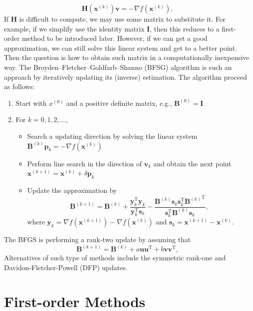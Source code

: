 \documentclass[
]{book}
\providecommand{\tightlist}{%
  \setlength{\itemsep}{0pt}\setlength{\parskip}{0pt}}
\theoremstyle{definition}
\theoremstyle{definition}
\theoremstyle{definition}
\theoremstyle{definition}
\theoremstyle{remark}
\begin{document}
\[\mathbf{H}(\mathbf{x}^{(k)}) \mathbf{v}= - \nabla f(\mathbf{x}^{(k)}), \]
If \(\mathbf{H}\) is difficult to compute, we may use some matrix to substitute it. For example, if we simplify use the identity matrix \(\mathbf{I}\), then this reduces to a first-order method to be introduced later. However, if we can get a good approximation, we can still solve this linear system and get to a better point. Then the question is how to obtain such matrix in a computationally inexpensive way. The Broyden--Fletcher--Goldfarb--Shanno (BFSG) algorithm is such an approach by iteratively updating its (inverse) estimation. The algorithm proceed as follows:

\begin{enumerate}
\def\labelenumi{\arabic{enumi})}
\tightlist
\item
  Start with \(x^{(0)}\) and a positive definite matrix, e.g., \(\mathbf{B}^{(0)} = \mathbf{I}\)
\item
  For \(k = 0, 1, 2, \ldots\),

  \begin{itemize}
  \tightlist
  \item
    Search a updating direction by solving the linear system \(\mathbf{B}^{(k)} \mathbf{p}_k = - \nabla f(\mathbf{x}^{(k)})\)
  \item
    Perform line search in the direction of \(\mathbf{v}_k\) and obtain the next point \(\mathbf{x}^{(k+1)} = \mathbf{x}^{(k)} + \delta \mathbf{p}_k\)
  \item
    Update the approximation by
    \[ \mathbf{B}^{(k+1)} = \mathbf{B}^{(k)} + \frac{\mathbf{y}_k^\text{T}\mathbf{y}_{k}}{ \mathbf{y}_{k}^\text{T}\mathbf{s}_{k} } -  \frac{\mathbf{B}^{(k)}\mathbf{s}_{k}\mathbf{s}_{k}^\text{T}{\mathbf{B}^{(k)}}^\text{T}}{\mathbf{s}_{k}^\text{T}\mathbf{B}^{(k)} \mathbf{s}_{k} }, \]
    where \(\mathbf{y}_k = \nabla f(\mathbf{x}^{(k+1)}) - \nabla f(\mathbf{x}^{(k)})\) and \(\mathbf{s}_{k} = \mathbf{x}^{(k+1)} - \mathbf{x}^{(k)}\).
  \end{itemize}
\end{enumerate}

The BFGS is performing a rank-two update by assuming that
\[ \mathbf{B}^{(k+1)} = \mathbf{B}^{(k)} + a \mathbf{u}\mathbf{u}^\text{T}+ b \mathbf{v}\mathbf{v}^\text{T},\]
Alternatives of such type of methods include the symmetric rank-one and Davidon-Fletcher-Powell (DFP) updates.

\hypertarget{first-order-methods}{%
\section{First-order Methods}\label{first-order-methods}}
\end{document}
